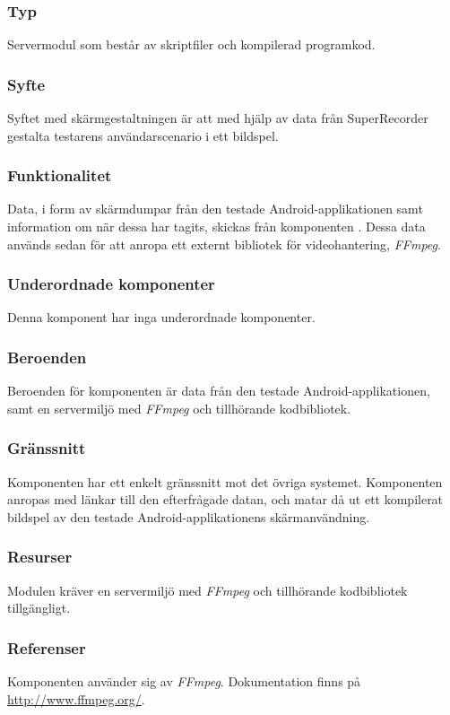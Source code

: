 \subsubsection{Typ}
Servermodul som består av skriptfiler och kompilerad programkod.

\subsubsection{Syfte}
Syftet med skärmgestaltningen är att med hjälp av data från SuperRecorder gestalta testarens användarscenario i ett bildspel.

\subsubsection{Funktionalitet}
Data, i form av skärmdumpar från den testade Android-applikationen samt information om när dessa har tagits, skickas från komponenten . Dessa data används sedan för att anropa ett externt bibliotek för videohantering, \textit{FFmpeg}.

\subsubsection{Underordnade komponenter}
Denna komponent har inga underordnade komponenter.

\subsubsection{Beroenden}
Beroenden för komponenten är data från den testade Android-applikationen, samt en servermiljö med \textit{FFmpeg} och tillhörande kodbibliotek.

\subsubsection{Gränssnitt}
Komponenten har ett enkelt gränssnitt mot det övriga systemet. Komponenten anropas med länkar till den efterfrågade datan, och matar då ut ett kompilerat bildspel av den testade Android-applikationens skärmanvändning.

\subsubsection{Resurser}
Modulen kräver en servermiljö med \textit{FFmpeg} och tillhörande kodbibliotek tillgängligt.

\subsubsection{Referenser}
Komponenten använder sig av \textit{FFmpeg}. Dokumentation finns på \url{http://www.ffmpeg.org/}.

